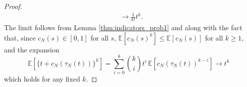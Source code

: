 \documentclass{article}
\newcommand{\E}{\mathbb{E}}
\newcommand{\1}[1]{\mathbbm{1}_{#1}}
\begin{document}
\begin{proof}
\begin{align}
&\longrightarrow \frac{1}{k!} t^k . \label{eq:19a}
\end{align}
The limit follows from Lemma \ref{thm:indicators_prob1} and \citet[Equations (3),(4)]{brown2020} along with the fact that, since $c_N(s) \in [0,1]$ for all $s$, $\E[c_N(s)^k] \leq \E[c_N(s)]$ for all $k\geq 1$, and the expansion
\begin{equation}\label{eq:11}
\E\left[ \{t+ c_N(\tau_N(t)) \}^k \right]
=\sum_{i=0}^k \binom{k}{i} t^i \,
\E\left[ c_N(\tau_N(t))^{k-i} \right]
\longrightarrow t^k 
\end{equation}
which holds for any fixed $k$.


\end{proof}
\end{document}
